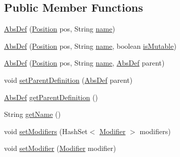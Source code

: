 \subsection*{Public Member Functions}
\begin{DoxyCompactItemize}
\item 
\hyperlink{classcompiler_1_1abstr_1_1tree_1_1def_1_1_abs_def_ab981c24e02c5ff191c2f4ebf6093cfe1}{Abs\+Def} (\hyperlink{classcompiler_1_1_position}{Position} pos, String \hyperlink{classcompiler_1_1abstr_1_1tree_1_1def_1_1_abs_def_ac6bda9377f5abbb5f1be7d3d1b16481b}{name})
\item 
\hyperlink{classcompiler_1_1abstr_1_1tree_1_1def_1_1_abs_def_acd677af4998506aa1c35f897ff6ea2e0}{Abs\+Def} (\hyperlink{classcompiler_1_1_position}{Position} pos, String \hyperlink{classcompiler_1_1abstr_1_1tree_1_1def_1_1_abs_def_ac6bda9377f5abbb5f1be7d3d1b16481b}{name}, boolean \hyperlink{classcompiler_1_1abstr_1_1tree_1_1def_1_1_abs_def_adf1015b5167218d03ec28a486fcf4b66}{is\+Mutable})
\item 
\hyperlink{classcompiler_1_1abstr_1_1tree_1_1def_1_1_abs_def_a33f65af966d28e0839a033dac9947ca9}{Abs\+Def} (\hyperlink{classcompiler_1_1_position}{Position} pos, String \hyperlink{classcompiler_1_1abstr_1_1tree_1_1def_1_1_abs_def_ac6bda9377f5abbb5f1be7d3d1b16481b}{name}, \hyperlink{classcompiler_1_1abstr_1_1tree_1_1def_1_1_abs_def}{Abs\+Def} parent)
\item 
void \hyperlink{classcompiler_1_1abstr_1_1tree_1_1def_1_1_abs_def_a71ba99b2824a8e144870191a6a72b6f1}{set\+Parent\+Definition} (\hyperlink{classcompiler_1_1abstr_1_1tree_1_1def_1_1_abs_def}{Abs\+Def} parent)
\item 
\hyperlink{classcompiler_1_1abstr_1_1tree_1_1def_1_1_abs_def}{Abs\+Def} \hyperlink{classcompiler_1_1abstr_1_1tree_1_1def_1_1_abs_def_a733146da3b86222096ad0e79362ebbb3}{get\+Parent\+Definition} ()
\item 
String \hyperlink{classcompiler_1_1abstr_1_1tree_1_1def_1_1_abs_def_a5e60c957f783bf4b1bde9ef7cd4ffe1c}{get\+Name} ()
\item 
void \hyperlink{classcompiler_1_1abstr_1_1tree_1_1def_1_1_abs_def_a998f0f94c7bd7eb8606d4b9840bdf810}{set\+Modifiers} (Hash\+Set$<$ \hyperlink{enumcompiler_1_1abstr_1_1tree_1_1_modifier}{Modifier} $>$ modifiers)
\item 
void \hyperlink{classcompiler_1_1abstr_1_1tree_1_1def_1_1_abs_def_a68235688a0f1089cb802e120032fe6fc}{set\+Modifier} (\hyperlink{enumcompiler_1_1abstr_1_1tree_1_1_modifier}{Modifier} modifier)
\item 

\end{DoxyCompactItemize}
